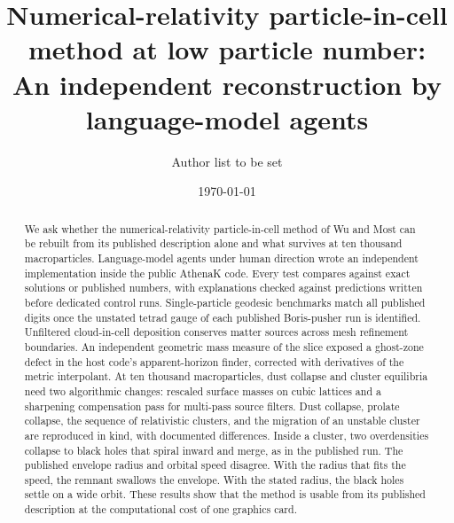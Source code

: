 \title{Numerical-relativity particle-in-cell method at low particle number:\\ An independent reconstruction by language-model agents}

\author{Author list to be set}
\noaffiliation

\date{\today}

\begin{abstract}
We ask whether the numerical-relativity particle-in-cell method of Wu and Most can be rebuilt from its published description alone and what survives at ten thousand macroparticles. Language-model agents under human direction wrote an independent implementation inside the public AthenaK code. Every test compares against exact solutions or published numbers, with explanations checked against predictions written before dedicated control runs. Single-particle geodesic benchmarks match all published digits once the unstated tetrad gauge of each published Boris-pusher run is identified. Unfiltered cloud-in-cell deposition conserves matter sources across mesh refinement boundaries. An independent geometric mass measure of the slice exposed a ghost-zone defect in the host code's apparent-horizon finder, corrected with derivatives of the metric interpolant. At ten thousand macroparticles, dust collapse and cluster equilibria need two algorithmic changes: rescaled surface masses on cubic lattices and a sharpening compensation pass for multi-pass source filters. Dust collapse, prolate collapse, the sequence of relativistic clusters, and the migration of an unstable cluster are reproduced in kind, with documented differences. Inside a cluster, two overdensities collapse to black holes that spiral inward and merge, as in the published run. The published envelope radius and orbital speed disagree. With the radius that fits the speed, the remnant swallows the envelope. With the stated radius, the black holes settle on a wide orbit. These results show that the method is usable from its published description at the computational cost of one graphics card.
\end{abstract}

\maketitle
